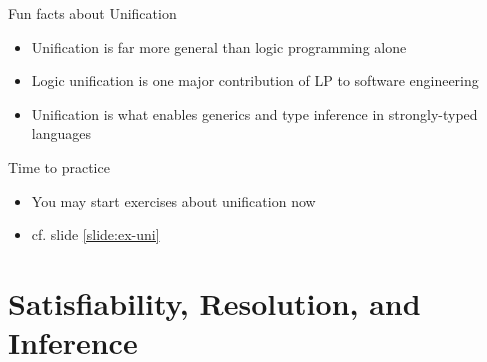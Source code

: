 \documentclass[presentation]{beamer}\mode<presentation>{\usetheme{AMSBolognaFC}}
\begin{document}
\begin{frame}{Fun facts about Unification}
    \begin{itemize}
        \item Unification is far more general than logic programming alone

        \vfill

        \item Logic unification is one major contribution of LP to \alert{software engineering}

        \vfill

        \item Unification is what enables \alert{generics} and \alert{type inference} in strongly-typed languages
    \end{itemize}
\end{frame}

\begin{frame}
    \begin{block}{Time to practice}
        \begin{itemize}
            \item You may start exercises about \alert{unification} now
            \item cf. slide \ref{slide:ex-uni}
        \end{itemize}
    \end{block}
\end{frame}

\section{Satisfiability, Resolution, and Inference}
\end{document}
